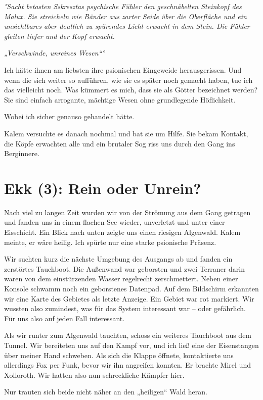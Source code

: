 \documentclass[11pt]{article}
\begin{document}
\emph{°Sacht betasten Sskresztas psychische Fühler den geschnäbelten
Steinkopf des Malux. Sie streicheln wie Bänder aus zarter Seide über die
Oberfläche und ein unsichtbares aber deutlich zu spürendes Licht erwacht
in dem Stein. Die Fühler gleiten tiefer und der Kopf erwacht.}

\emph{„Verschwinde, unreines Wesen``°}

Ich hätte ihnen am liebsten ihre psionischen Eingeweide herausgerissen.
Und wenn die sich weiter so aufführen, wie sie es später noch gemacht
haben, tue ich das vielleicht noch. Was kümmert es mich, dass sie als
Götter bezeichnet werden? Sie sind einfach arrogante, mächtige Wesen
ohne grundlegende Höflichkeit.

Wobei ich sicher genauso gehandelt hätte.

Kalem versuchte es danach nochmal und bat sie um Hilfe. Sie bekam
Kontakt, die Köpfe erwachten alle und ein brutaler Sog riss uns durch
den Gang ins Berginnere.

\section{Ekk (3): Rein oder Unrein?}

Nach viel zu langen Zeit wurden wir von der Strömung aus dem Gang
getragen und fanden uns in einem flachen See wieder, unverletzt und
unter einer Eisschicht. Ein Blick nach unten zeigte uns einen riesigen
Algenwald. Kalem meinte, er wäre heilig. Ich spürte nur eine starke
psionische Präsenz.

Wir suchten kurz die nächste Umgebung des Ausgangs ab und fanden ein
zerstörtes Tauchboot. Die Außenwand war geborsten und zwei Terraner
darin waren von dem einstürzenden Wasser regelrecht zerschmettert. Neben
einer Konsole schwamm noch ein geborstenes Datenpad. Auf dem Bildschirm
erkannten wir eine Karte des Gebietes als letzte Anzeige. Ein Gebiet war
rot markiert. Wir wussten also zumindest, was für das System interessant
war -- oder gefährlich. Für uns also auf jeden Fall interessant.

Als wir runter zum Algenwald tauchten, schoss ein weiteres Tauchboot aus
dem Tunnel. Wir bereiteten uns auf den Kampf vor, und ich ließ eine der
Eisenstangen über meiner Hand schweben. Als sich die Klappe öffnete,
kontaktierte uns allerdings Fox per Funk, bevor wir ihn angreifen
konnten. Er brachte Mirel und Xolloroth. Wir hatten also nun
schreckliche Kämpfer hier.

Nur trauten sich beide nicht näher an den „heiligen`` Wald heran.
\end{document}
